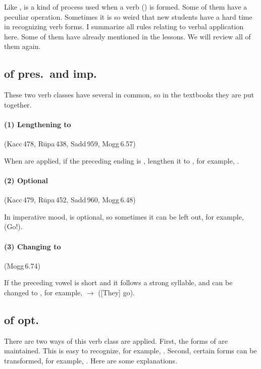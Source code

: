Like ,  is a kind of process used when a verb () is formed. Some of them have a peculiar operation. Sometimes it is so weird that new students have a hard time in recognizing verb forms. I summarize all rules relating to verbal  application here. Some of them have already mentioned in the lessons. We will review all of them again.

\subsection*{ of pres.\ and imp.}

These two verb classes have several in common, so in the textbooks they are put together.

\paragraph*{(1) Lengthening  to } (Kacc\,478, R\=upa\,438, Sadd\,959, Mogg\,6.57)\par
When  are applied, if the preceding ending is , lengthen it to , for example, .

\paragraph*{(2) Optional } (Kacc\,479, R\=upa\,452, Sadd\,960, Mogg\,6.48)\par
In imperative mood,  is optional, so sometimes it can be left out, for example,  (Go!).

\paragraph*{(3) Changing  to } (Mogg\,6.74)\par
If the preceding vowel is short and it follows a strong syllable,  and  can be changed to , for example,  $\rightarrow$  ([They] go).

\subsection*{ of opt.}

There are two ways  of this verb class are applied. First, the forms of  are maintained. This is easy to recognize, for example, . Second, certain forms can be transformed, for example, . Here are some explanations.

